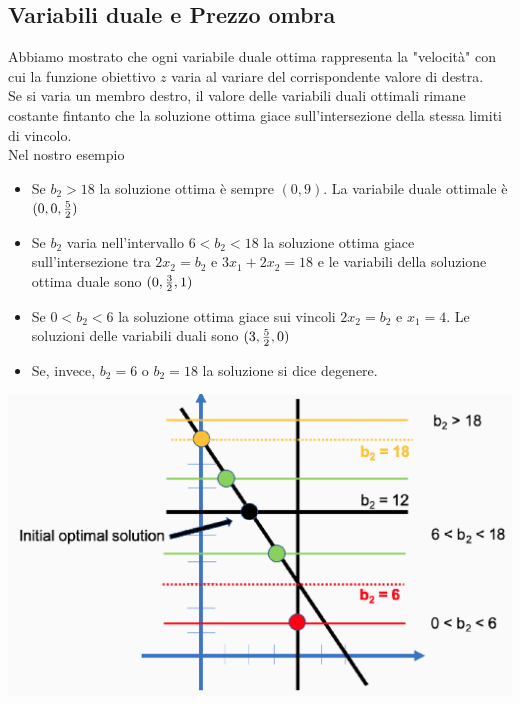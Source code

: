 \documentclass[12pt,a4paper]{article}
\begin{document}
\subsection{Variabili duale e Prezzo ombra}
Abbiamo mostrato che ogni variabile duale ottima rappresenta la "velocità" con cui la funzione obiettivo $z$ varia al variare del corrispondente valore di destra.\\
Se si varia un membro destro, il valore delle variabili duali ottimali rimane costante fintanto che la soluzione ottima giace sull'intersezione della stessa limiti di vincolo.\\
Nel nostro esempio
\begin{itemize}
\item Se $b_2 > 18$ la soluzione ottima è sempre $(0,9)$. La variabile duale ottimale è $(0,0,{5\over2})$
\item Se $b_2$ varia nell'intervallo $6<b_2<18$ la soluzione ottima giace sull'intersezione tra $2x_2 = b_2$ e $3x_1+2x_2=18$ e le variabili della soluzione ottima duale sono $(0,{3\over2},1)$
\item Se $0<b_2<6$ la soluzione ottima giace sui vincoli $2x_2=b_2$ e $x_1=4$. Le soluzioni delle variabili duali sono $(3,{5\over2},0)$
\item Se, invece, $b_2=6$ o $b_2=18$ la soluzione si dice degenere. 
\end{itemize}
\begin{center}
\includegraphics[width=0.5\columnwidth]{img/shadow_price_extris.png}
\end{center}
\end{document}
